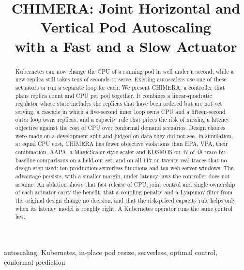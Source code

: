 \documentclass[conference]{IEEEtran}
\begin{document}
\title{CHIMERA: Joint Horizontal and Vertical Pod Autoscaling\\with a Fast and a Slow Actuator}

\author{
}

\maketitle

\begin{abstract}
Kubernetes can now change the CPU of a running pod in well under a second, while a new
replica still takes tens of seconds to serve. Existing autoscalers use one of these
actuators or run a separate loop for each. We present CHIMERA, a controller that plans
replica count and CPU per pod together. It combines a linear-quadratic regulator whose
state includes the replicas that have been ordered but are not yet serving, a cascade in
which a five-second inner loop owns CPU and a fifteen-second outer loop owns replicas, and
a capacity rule that prices the risk of missing a latency objective against the cost of
CPU over conformal demand scenarios. Design choices were made on a development split and
judged on data they did not see. In simulation, at equal CPU cost, CHIMERA has fewer
objective violations than HPA, VPA, their combination, AAPA, a MagicScaler-style scaler
and KOSMOS on 47 of 48 trace-by-baseline comparisons on a held-out set, and on all 117 on
twenty real traces that no design step used: ten production serverless functions and ten
web-server windows. The advantage persists, with a smaller margin, under latency laws the
controller does not assume. An ablation shows that fast release of CPU, joint control and
single ownership of each actuator carry the benefit, that a coupling penalty and a
Lyapunov filter from the original design change no decision, and that the risk-priced
capacity rule helps only when its latency model is roughly right. A Kubernetes operator
runs the same control law. \ReplayAbstract
\end{abstract}

\begin{IEEEkeywords}
autoscaling, Kubernetes, in-place pod resize, serverless, optimal control, conformal prediction
\end{IEEEkeywords}
\end{document}

